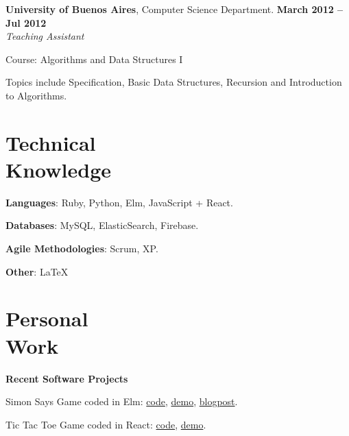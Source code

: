 \documentclass[margin,line]{resume}
\begin{document}
\begin{resume}
\textbf{University of Buenos Aires}, Computer Science Department. \hfill \textbf{March 2012 --  Jul 2012}
\\
\textsl{Teaching Assistant} \hfill
\begin{list2}
	\item Course: Algorithms and Data Structures I
	\item Topics include Specification, Basic Data Structures, Recursion and Introduction to Algorithms.
\end{list2}\vspace{-1.5mm}

\vspace{2mm}


\section{\mysidestyle Technical\\Knowledge}


\textbf{Languages}: Ruby, Python, Elm, JavaScript + React. \vspace{-2mm}
    
\textbf{Databases}: MySQL, ElasticSearch, Firebase. \vspace{-2mm}
    
\textbf{Agile Methodologies}: Scrum, XP. \vspace{-2mm}

\textbf{Other}: \LaTeX \vspace{-2mm}


\newpage

\section{\mysidestyle Personal\\Work}

\textbf{Recent Software Projects}
\begin{list2}
\item Simon Says Game coded in Elm: \href{https://github.com/carohadad/simon-elm}{code}, \href{https://carohadad.github.io/simon-elm/}{demo}, \href{https://medium.com/@carohadad/mi-primer-programa-en-elm-574ce6a445c3}{blogpost}.

\item Tic Tac Toe Game coded in React: \href{https://github.com/carohadad/tic-tac-toe-react}{code}, \href{https://carohadad.github.io/tic-tac-toe-react/}{demo}.


\end{list2}
\end{resume}
\end{document}
